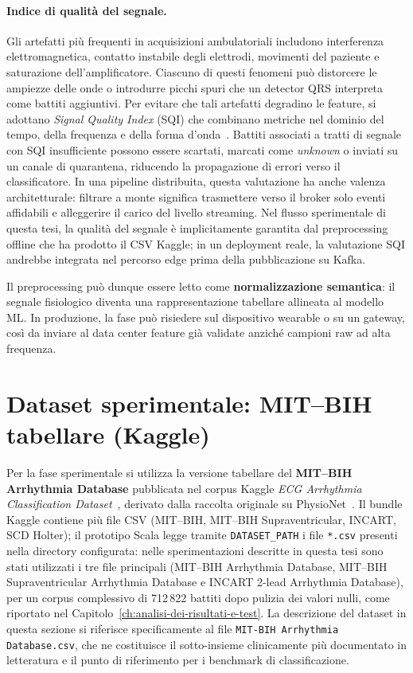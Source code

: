 \paragraph{Indice di qualità del segnale.}
Gli artefatti più frequenti in acquisizioni ambulatoriali includono interferenza elettromagnetica, contatto instabile degli elettrodi, movimenti del paziente e saturazione dell'amplificatore.
Ciascuno di questi fenomeni può distorcere le ampiezze delle onde o introdurre picchi spuri che un detector QRS interpreta come battiti aggiuntivi.
Per evitare che tali artefatti degradino le feature, si adottano \emph{Signal Quality Index} (SQI) che combinano metriche nel dominio del tempo, della frequenza e della forma d'onda~\cite{li2008sqi}.
Battiti associati a tratti di segnale con SQI insufficiente possono essere scartati, marcati come \emph{unknown} o inviati su un canale di quarantena, riducendo la propagazione di errori verso il classificatore.
In una pipeline distribuita, questa valutazione ha anche valenza architetturale: filtrare a monte significa trasmettere verso il broker solo eventi affidabili e alleggerire il carico del livello streaming.
Nel flusso sperimentale di questa tesi, la qualità del segnale è implicitamente garantita dal preprocessing offline che ha prodotto il CSV Kaggle; in un deployment reale, la valutazione SQI andrebbe integrata nel percorso edge prima della pubblicazione su Kafka.

Il preprocessing può dunque essere letto come \textbf{normalizzazione semantica}: il segnale fisiologico diventa una rappresentazione tabellare allineata al modello ML.
In produzione, la fase può risiedere sul dispositivo wearable o su un gateway, così da inviare al data center feature già validate anziché campioni raw ad alta frequenza.

\section{Dataset sperimentale: MIT--BIH tabellare (Kaggle)}\label{sec:dataset}

Per la fase sperimentale si utilizza la versione tabellare del \textbf{MIT--BIH Arrhythmia Database} pubblicata nel corpus Kaggle \emph{ECG Arrhythmia Classification Dataset}~\cite{sakib2021kaggle,sakib2021edge}, derivato dalla raccolta originale su PhysioNet~\cite{moody2001impact,goldberger2000physiobank}.
Il bundle Kaggle contiene più file CSV (MIT--BIH, MIT--BIH Supraventricular, INCART, SCD Holter); il prototipo Scala legge tramite \texttt{DATASET\_PATH} i file \texttt{*.csv} presenti nella directory configurata: nelle sperimentazioni descritte in questa tesi sono stati utilizzati i tre file principali (MIT--BIH Arrhythmia Database, MIT--BIH Supraventricular Arrhythmia Database e INCART 2-lead Arrhythmia Database), per un corpus complessivo di 712\,822 battiti dopo pulizia dei valori nulli, come riportato nel Capitolo~\ref{ch:analisi-dei-risultati-e-test}.
La descrizione del dataset in questa sezione si riferisce specificamente al file \texttt{MIT-BIH Arrhythmia Database.csv}, che ne costituisce il sotto-insieme clinicamente più documentato in letteratura e il punto di riferimento per i benchmark di classificazione.

